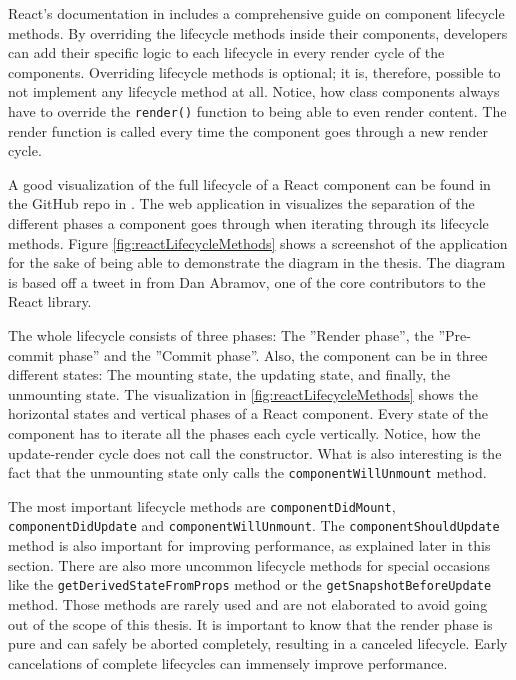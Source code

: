 React's documentation in \cite[/docs/react-component.html]{React} includes a comprehensive guide on component lifecycle methods. By overriding the lifecycle methods inside their components, developers can add their specific logic to each lifecycle in every render cycle of the components. Overriding lifecycle methods is optional; it is, therefore, possible to not implement any lifecycle method at all. Notice, how class components always have to override the \texttt{render()} function to being able to even render content. The render function is called every time the component goes through a new render cycle.

A good visualization of the full lifecycle of a React component can be found in the GitHub repo in \cite{ReactRenderCycleGithub}. The web application in \cite{ReactRenderCycleDiagram} visualizes the separation of the different phases a component goes through when iterating through its lifecycle methods. Figure \ref{fig:reactLifecycleMethods} shows a screenshot of the application for the sake of being able to demonstrate the diagram in the thesis. The diagram is based off a tweet in \cite{ReactCycleTweet} from Dan Abramov, one of the core contributors to the React library.

The whole lifecycle consists of three phases: The ''Render phase'', the ''Pre-commit phase'' and the ''Commit phase''. Also, the component can be in three different states: The mounting state, the updating state, and finally, the unmounting state. The visualization in \ref{fig:reactLifecycleMethods} shows the horizontal states and vertical phases of a React component. Every state of the component has to iterate all the phases each cycle vertically. Notice, how the update-render cycle does not call the constructor. What is also interesting is the fact that the unmounting state only calls the \texttt{componentWillUnmount} method.

The most important lifecycle methods are \texttt{componentDidMount}, \texttt{componentDidUpdate} and \texttt{componentWillUnmount}. The \texttt{componentShouldUpdate} method is also important for improving performance, as explained later in this section. There are also more uncommon lifecycle methods for special occasions like the \texttt{getDerivedStateFromProps} method or the \texttt{getSnapshotBeforeUpdate} method. Those methods are rarely used and are not elaborated to avoid going out of the scope of this thesis. It is important to know that the render phase is pure and can safely be aborted completely, resulting in a canceled lifecycle. Early cancelations of complete lifecycles can immensely improve performance.

